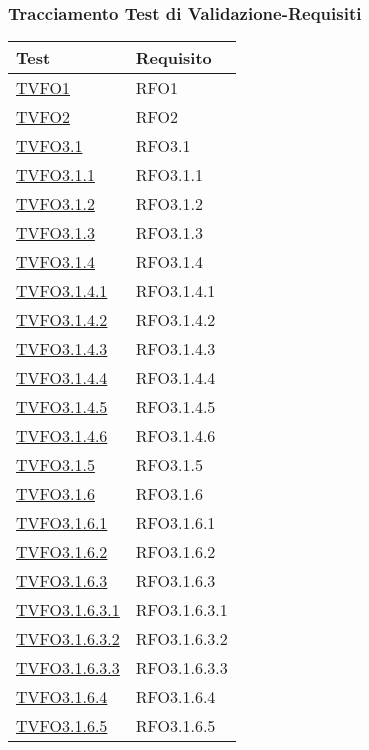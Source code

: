 \subsubsection{Tracciamento Test di Validazione-Requisiti}
\normalsize
\begin{longtable}{|>{\centering}m{5cm}|m{5cm}<{\centering}|}
\hline 
\textbf{Test} & \textbf{Requisito}\\
\hline
\endhead
\hyperlink{TVFO1}{TVFO1} & RFO1\\ \hline
\hyperlink{TVFO2}{TVFO2} & RFO2\\ \hline
\hyperlink{TVFO3.1}{TVFO3.1} & RFO3.1\\ \hline
\hyperlink{TVFO3.1.1}{TVFO3.1.1} & RFO3.1.1\\ \hline
\hyperlink{TVFO3.1.2}{TVFO3.1.2} & RFO3.1.2\\ \hline
\hyperlink{TVFO3.1.3}{TVFO3.1.3} & RFO3.1.3\\ \hline
\hyperlink{TVFO3.1.4}{TVFO3.1.4} & RFO3.1.4\\ \hline
\hyperlink{TVFO3.1.4.1}{TVFO3.1.4.1} & RFO3.1.4.1\\ \hline
\hyperlink{TVFO3.1.4.2}{TVFO3.1.4.2} & RFO3.1.4.2\\ \hline
\hyperlink{TVFO3.1.4.3}{TVFO3.1.4.3} & RFO3.1.4.3\\ \hline
\hyperlink{TVFO3.1.4.4}{TVFO3.1.4.4} & RFO3.1.4.4\\ \hline
\hyperlink{TVFO3.1.4.5}{TVFO3.1.4.5} & RFO3.1.4.5\\ \hline
\hyperlink{TVFO3.1.4.6}{TVFO3.1.4.6} & RFO3.1.4.6\\ \hline
\hyperlink{TVFO3.1.5}{TVFO3.1.5} & RFO3.1.5\\ \hline
\hyperlink{TVFO3.1.6}{TVFO3.1.6} & RFO3.1.6\\ \hline
\hyperlink{TVFO3.1.6.1}{TVFO3.1.6.1} & RFO3.1.6.1\\ \hline
\hyperlink{TVFO3.1.6.2}{TVFO3.1.6.2} & RFO3.1.6.2\\ \hline
\hyperlink{TVFO3.1.6.3}{TVFO3.1.6.3} & RFO3.1.6.3\\ \hline
\hyperlink{TVFO3.1.6.3.1}{TVFO3.1.6.3.1} & RFO3.1.6.3.1\\ \hline
\hyperlink{TVFO3.1.6.3.2}{TVFO3.1.6.3.2} & RFO3.1.6.3.2\\ \hline
\hyperlink{TVFO3.1.6.3.3}{TVFO3.1.6.3.3} & RFO3.1.6.3.3\\ \hline
\hyperlink{TVFO3.1.6.4}{TVFO3.1.6.4} & RFO3.1.6.4\\ \hline
\hyperlink{TVFO3.1.6.5}{TVFO3.1.6.5} & RFO3.1.6.5\\ \hline

\end{longtable}
